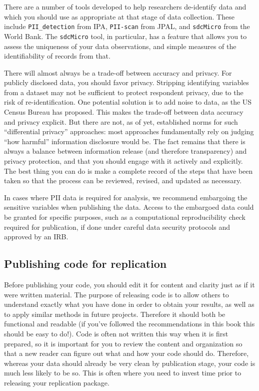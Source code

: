 There are a number of tools developed to help researchers de-identify data
and which you should use as appropriate at that stage of data collection.
These include \texttt{PII\_detection}
from IPA,
\texttt{PII-scan}
from JPAL,
and \texttt{sdcMicro}
from the World Bank.
The \texttt{sdcMicro} tool, in particular, has a feature
that allows you to assess the uniqueness of your data observations,
and simple measures of the identifiability of records from that.

There will almost always be a trade-off between accuracy and privacy.
For publicly disclosed data, you should favor privacy.
Stripping identifying variables from a dataset may not be sufficient to protect respondent privacy,
due to the risk of re-identification. 
One potential solution is to add noise to data, as the US Census Bureau has proposed.\cite{abowd2018us}
This makes the trade-off between data accuracy and privacy explicit.
But there are not, as of yet, established norms for such ``differential privacy'' approaches:
most approaches fundamentally rely on judging ``how harmful'' information disclosure would be.
The fact remains that there is always a balance between information release (and therefore transparency)
and privacy protection, and that you should engage with it actively and explicitly.
The best thing you can do is make a complete record of the steps that have been taken
so that the process can be reviewed, revised, and updated as necessary.

In cases where PII data is required for analysis,
we recommend embargoing the sensitive variables when publishing the data.
Access to the embargoed data could be granted for specific purposes,
such as a computational reproducibility check required for publication,
if done under careful data security protocols and approved by an IRB.


\subsection{Publishing code for replication}

Before publishing your code, you should edit it for content and clarity
just as if it were written material.
The purpose of releasing code is to allow others to understand
exactly what you have done in order to obtain your results,
as well as to apply similar methods in future projects.
Therefore it should both be functional and readable
(if you've followed the recommendations in this book
this should be easy to do!).
Code is often not written this way when it is first prepared,
so it is important for you to review the content and organization
so that a new reader can figure out what and how your code should do.
Therefore, whereas your data should already be very clean by publication stage,
your code is much less likely to be so. 
This is often where you need to invest time prior to releasing your replication package.

